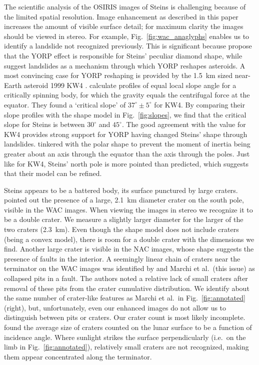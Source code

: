 \documentclass[preprint,3p,authoryear]{elsarticle}
\begin{document}
The scientific analysis of the OSIRIS images of Steins is challenging because of the limited spatial resolution. Image enhancement as described in this paper increases the amount of visible surface detail; for maximum clarity the images should be viewed in stereo. For example, Fig.~\ref{fig:wac_anaglyphs} enables us to identify a landslide not recognized previously. This is significant because \citet{K09} propose that the YORP effect is responsible for Steins' peculiar diamond shape, while \citet{H09} suggest landslides as a mechanism through which YORP reshapes asteroids. A most convincing case for YORP reshaping is provided by the 1.5~km sized near-Earth asteroid 1999 KW4 \citep{O06}. \citeauthor{H09} calculate profiles of equal local slope angle for a critically spinning body, for which the gravity equals the centrifugal force at the equator. They found a `critical slope' of $37^\circ\pm5^\circ$ for KW4. By comparing their slope profiles with the \citet{K09} shape model in Fig.~\ref{fig:slopes}, we find that the critical slope for Steins is between $30^\circ$ and $45^\circ$. The good agreement with the value for KW4 provides strong support for YORP having changed Steins' shape through landslides. \citeauthor{H09} tinkered with the polar shape to prevent the moment of inertia being greater about an axis through the equator than the axis through the poles. Just like for KW4, Steins' north pole is more pointed than predicted, which suggests that their model can be refined.

Steins appears to be a battered body, its surface punctured by large craters. \citet{K09} pointed out the presence of a large, 2.1~km diameter crater on the south pole, visible in the WAC images. When viewing the images in stereo we recognize it to be a double crater. We measure a slightly larger diameter for the larger of the two craters (2.3~km). Even though the \citeauthor{K09} shape model does not include craters (being a convex model), there is room for a double crater with the dimensions we find. Another large crater is visible in the NAC images, whose shape suggests the presence of faults in the interior. A seemingly linear chain of craters near the terminator on the WAC images was identified by \citet{K09} and Marchi et al.\ (this issue) as collapsed pits in a fault. The authors noted a relative lack of small craters after removal of these pits from the crater cumulative distribution. We identify about the same number of crater-like features as Marchi et al.\ in Fig.~\ref{fig:annotated} (right), but, unfortunately, even our enhanced images do not allow us to distinguish between pits or craters. Our crater count is most likely incomplete. \citet{W05} found the average size of craters counted on the lunar surface to be a function of incidence angle. Where sunlight strikes the surface perpendicularly (i.e.\ on the limb in Fig.~\ref{fig:annotated}), relatively small craters are not recognized, making them appear concentrated along the terminator.
\end{document}
